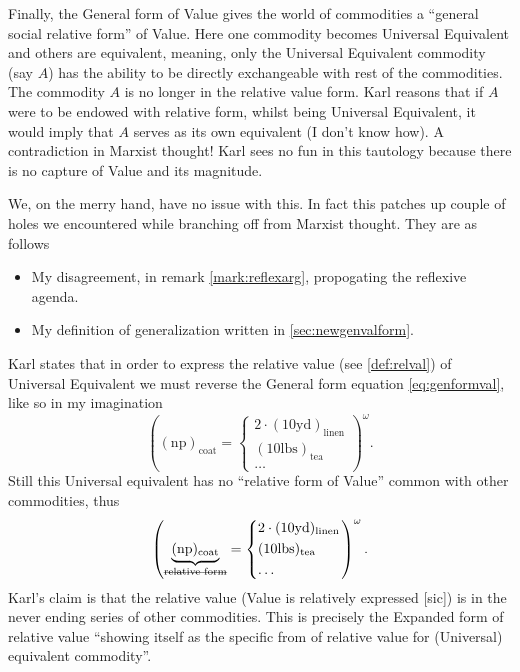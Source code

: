 \documentclass[12pt]{extarticle}
\theoremstyle{definition}
\begin{document}
Finally, the General form of Value gives the world of commodities a ``general social relative form'' of Value.  Here one commodity becomes Universal Equivalent and others are equivalent, meaning, only the Universal Equivalent commodity (say $A$) has the ability to be directly exchangeable with rest of the commodities.  The commodity $A$ is no longer in the relative value form.  Karl reasons that if $A$ were to be endowed with relative form, whilst being Universal Equivalent, it would imply that $A$ serves as its own equivalent (I don't know how).  A contradiction in Marxist thought!  Karl sees no fun in this tautology because there is no capture of Value and its magnitude.

We, on the merry hand, have no issue with this.  In fact this patches up couple of holes we encountered while branching off from Marxist thought.  They are as follows
\begin{itemize}
\item My disagreement, in remark \ref{mark:reflexarg}, propogating the reflexive agenda.
\item My definition of generalization written in \ref{sec:newgenvalform}.
\end{itemize}

Karl states that in order to express the relative value (see \ref{def:relval}) of Universal Equivalent we must reverse the General form equation \ref{eq:genformval}, like so in my imagination
\begin{equation}
  \left(
  (\text{np})_{\text{coat}} = \begin{cases*} 
    2\cdot (10\text{yd})_{\text{linen}}\\
     (10\text{lbs})_{\text{tea}}\\
      \ldots
   \end{cases*}\right)^\omega.
\end{equation}
Still this Universal equivalent has no ``relative form of Value'' common with other commodities, thus
\begin{equation}
  \left(
  \underbrace{(\text{np})_{\text{coat}}}_{\text{\st{relative form}}} = \begin{cases*} 
    2\cdot (10\text{yd})_{\text{linen}}\\
     (10\text{lbs})_{\text{tea}}\\
      \ldots
   \end{cases*}\right)^\omega.
\end{equation}
 Karl's claim is that the relative value (Value is relatively expressed [sic]) is in the never ending series of other commodities.  This is precisely the Expanded form of relative value ``showing itself as the specific from of relative value for (Universal) equivalent commodity''.
\end{document}

